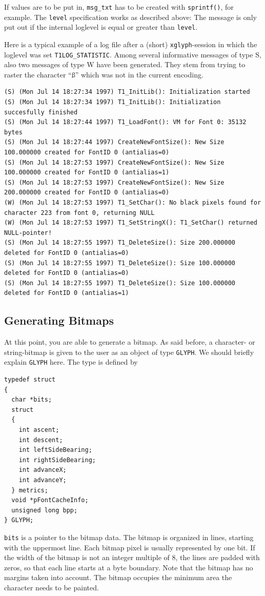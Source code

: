 If values are to be put in, \verb+msg_txt+ has to be created with
\verb+sprintf()+, for example. The \verb+level+ specification works as
described above: The message is only put out if the internal loglevel is
equal or greater than \verb+level+. 

Here is a typical example of a log file after a (short)
\verb+xglyph+-session in which the loglevel was set
\verb+T1LOG_STATISTIC+. Among several informative messages of type S, also two
messages of type W have been generated. They stem from trying to
raster the character ``\ss'' which was not in the current encoding. 
\par\noindent
{%
\tiny
\begin{verbatim}
(S) (Mon Jul 14 18:27:34 1997) T1_InitLib(): Initialization started 
(S) (Mon Jul 14 18:27:34 1997) T1_InitLib(): Initialization succesfully finished 
(S) (Mon Jul 14 18:27:44 1997) T1_LoadFont(): VM for Font 0: 35132 bytes 
(S) (Mon Jul 14 18:27:44 1997) CreateNewFontSize(): New Size 100.000000 created for FontID 0 (antialias=0) 
(S) (Mon Jul 14 18:27:53 1997) CreateNewFontSize(): New Size 100.000000 created for FontID 0 (antialias=1) 
(S) (Mon Jul 14 18:27:53 1997) CreateNewFontSize(): New Size 200.000000 created for FontID 0 (antialias=0) 
(W) (Mon Jul 14 18:27:53 1997) T1_SetChar(): No black pixels found for character 223 from font 0, returning NULL 
(W) (Mon Jul 14 18:27:53 1997) T1_SetStringX(): T1_SetChar() returned NULL-pointer! 
(S) (Mon Jul 14 18:27:55 1997) T1_DeleteSize(): Size 200.000000 deleted for FontID 0 (antialias=0) 
(S) (Mon Jul 14 18:27:55 1997) T1_DeleteSize(): Size 100.000000 deleted for FontID 0 (antialias=0) 
(S) (Mon Jul 14 18:27:55 1997) T1_DeleteSize(): Size 100.000000 deleted for FontID 0 (antialias=1) 
\end{verbatim}
}

\subsection{Generating Bitmaps}
\label{generatingbitmaps}%
At this point, you are able to generate a bitmap.
As said before, a character- or string-bitmap is given to the user as
an object of type \verb+GLYPH+. We should briefly explain \verb+GLYPH+
here. The type is defined by
\begin{verbatim}
typedef struct
{
  char *bits; 
  struct          
  {
    int ascent;
    int descent;
    int leftSideBearing;
    int rightSideBearing;
    int advanceX;
    int advanceY;
  } metrics;
  void *pFontCacheInfo;
  unsigned long bpp;
} GLYPH;
\end{verbatim}
\verb+bits+ is a pointer to the bitmap data. The
bitmap is organized in lines, starting with the uppermost line.
Each bitmap pixel is usually represented by one bit. If the width of
the 
bitmap is not an integer multiple of 8, the lines are padded with
zeros, so that each line starts at a byte boundary. Note that the
bitmap has no margins taken into account. The bitmap occupies the
minimum area the character needs to be painted. 

